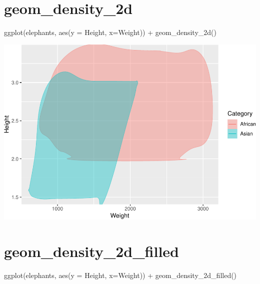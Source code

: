 \documentclass[
]{book}
\newenvironment{Shaded}{\begin{snugshade}}{\end{snugshade}}
\newcommand{\AttributeTok}[1]{\textcolor[rgb]{0.77,0.63,0.00}{#1}}
\newcommand{\FunctionTok}[1]{\textcolor[rgb]{0.00,0.00,0.00}{#1}}
\newcommand{\NormalTok}[1]{#1}
\newcommand{\SpecialCharTok}[1]{\textcolor[rgb]{0.00,0.00,0.00}{#1}}
\begin{document}
\hypertarget{geom_density_2d}{%
\section{geom\_density\_2d}\label{geom_density_2d}}

\begin{Shaded}
\begin{Highlighting}[]
\FunctionTok{ggplot}\NormalTok{(elephants, }\FunctionTok{aes}\NormalTok{(}\AttributeTok{y =}\NormalTok{ Height, }\AttributeTok{x=}\NormalTok{Weight)) }\SpecialCharTok{+} 
  \FunctionTok{geom\_density\_2d}\NormalTok{()}
\end{Highlighting}
\end{Shaded}

\includegraphics{Data-Visualisation-geom-Encyclopedia_files/figure-latex/unnamed-chunk-36-1.pdf}

\hypertarget{geom_density_2d_filled}{%
\section{geom\_density\_2d\_filled}\label{geom_density_2d_filled}}

\begin{Shaded}
\begin{Highlighting}[]
\FunctionTok{ggplot}\NormalTok{(elephants, }\FunctionTok{aes}\NormalTok{(}\AttributeTok{y =}\NormalTok{ Height, }\AttributeTok{x=}\NormalTok{Weight)) }\SpecialCharTok{+} 
  \FunctionTok{geom\_density\_2d\_filled}\NormalTok{()}
\end{Highlighting}
\end{Shaded}
\end{document}
